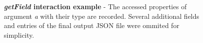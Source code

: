 \begin{figure}[h]
	\centering
	\begin{lrbox}{\mintedbox}
		\begin{minipage}{0.4\textwidth}
		\end{minipage}
	\end{lrbox}
	\hfill
	\begin{lrbox}{\mintedbox}
		\begin{minipage}{0.58\textwidth}
		\end{minipage}
	\end{lrbox}
	\caption[\textit{getField} interaction example]{\textbf{\textit{getField} interaction example} - The accessed properties of argument \textit{a} with their type are recorded. Several additional fields and entries of the final output JSON file were ommited for simplicity.}
	\label{fig:run-time-information-gathering-get-field}
\end{figure}